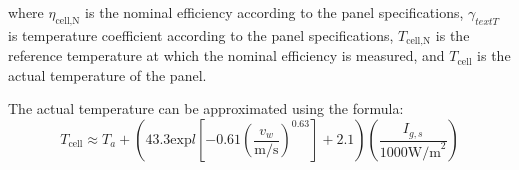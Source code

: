 where $\eta_{\text{cell,N}} $ is the nominal efficiency according to the panel specifications, $\gamma_{text{T}}$ is temperature coefficient according to the panel specifications, $T_{\text{cell,N}}$ is the reference temperature at which the nominal efficiency is measured, and $T_{\text{cell}}$ is the actual temperature of the panel. 

The actual temperature can be approximated using the formula:
\begin{equation}
	T_{\text{cell}} \approx T_a + \left( 43.3 \text{exp} l\left[-0.61 \left(\frac{v_w}{\text{m/s}} \right)^{0.63} \right] + 2.1 \right)\left(\frac{I_{g,s}}{1000\text{W/m}^2} \right)
\label{eq:temp_panel}
\end{equation}
